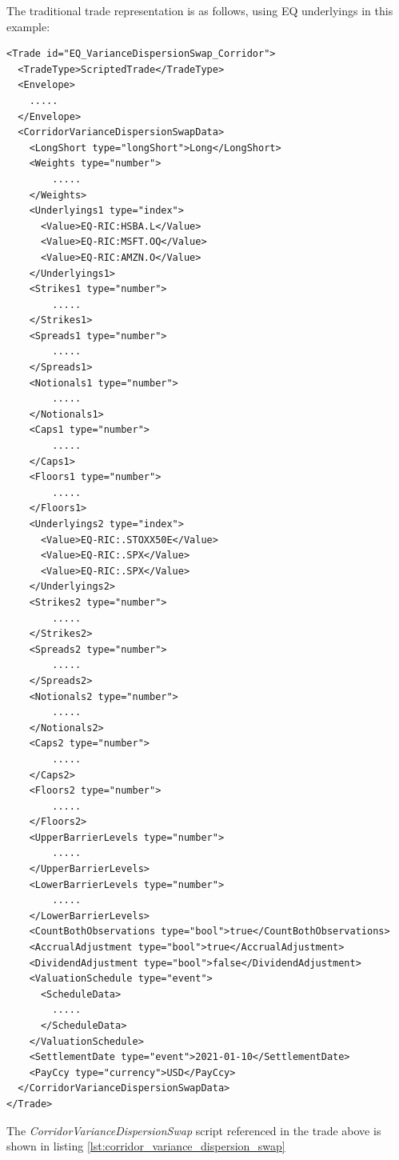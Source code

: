 The traditional trade representation is as follows, using EQ underlyings in this example:

\begin{verbatim}
<Trade id="EQ_VarianceDispersionSwap_Corridor">
  <TradeType>ScriptedTrade</TradeType>
  <Envelope>
    .....
  </Envelope>
  <CorridorVarianceDispersionSwapData>
    <LongShort type="longShort">Long</LongShort>
    <Weights type="number">
        .....
    </Weights>
    <Underlyings1 type="index">
      <Value>EQ-RIC:HSBA.L</Value>
      <Value>EQ-RIC:MSFT.OQ</Value>
      <Value>EQ-RIC:AMZN.O</Value>
    </Underlyings1>
    <Strikes1 type="number">
        .....
    </Strikes1>
    <Spreads1 type="number">
        .....
    </Spreads1>
    <Notionals1 type="number">
        .....
    </Notionals1>
    <Caps1 type="number">
        .....
    </Caps1>
    <Floors1 type="number">
        .....
    </Floors1>
    <Underlyings2 type="index">
      <Value>EQ-RIC:.STOXX50E</Value>
      <Value>EQ-RIC:.SPX</Value>
      <Value>EQ-RIC:.SPX</Value>
    </Underlyings2>
    <Strikes2 type="number">
        .....
    </Strikes2>
    <Spreads2 type="number">
        .....
    </Spreads2>
    <Notionals2 type="number">
        .....
    </Notionals2>
    <Caps2 type="number">
        .....
    </Caps2>
    <Floors2 type="number">
        .....
    </Floors2>
    <UpperBarrierLevels type="number">
        .....
    </UpperBarrierLevels>
    <LowerBarrierLevels type="number">
        .....
    </LowerBarrierLevels>
    <CountBothObservations type="bool">true</CountBothObservations>
    <AccrualAdjustment type="bool">true</AccrualAdjustment>
    <DividendAdjustment type="bool">false</DividendAdjustment>
    <ValuationSchedule type="event">
      <ScheduleData>
        .....
      </ScheduleData>
    </ValuationSchedule>
    <SettlementDate type="event">2021-01-10</SettlementDate>
    <PayCcy type="currency">USD</PayCcy>
  </CorridorVarianceDispersionSwapData>
</Trade>
\end{verbatim}

The \emph{CorridorVarianceDispersionSwap} script referenced in the trade above is shown in listing
\ref{lst:corridor_variance_dispersion_swap}

